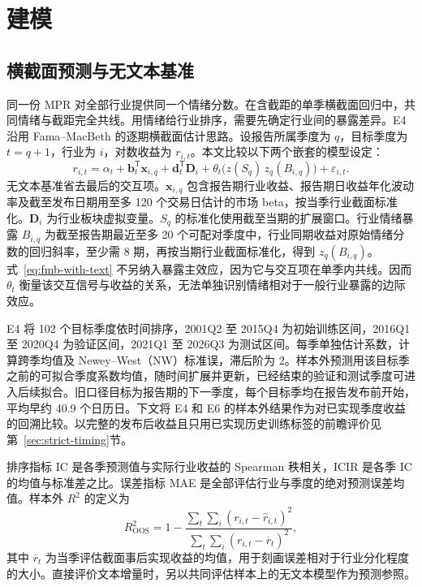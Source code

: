 \section{建模}\label{sec:models}

\subsection{横截面预测与无文本基准}

同一份 MPR 对全部行业提供同一个情绪分数。在含截距的单季横截面回归中，共同情绪与截距完全共线。用情绪给行业排序，需要先确定行业间的暴露差异。E4 沿用 Fama--MacBeth 的逐期横截面估计思路\cite{famaMacBeth1973}。设报告所属季度为 $q$，目标季度为 $t=q+1$，行业为 $i$，对数收益为 $r_{i,t}$。本文比较以下两个嵌套的模型设定：
\begin{equation}
  r_{i,t}=\alpha_t+\boldsymbol{b}_t^{\mathsf T}\boldsymbol{x}_{i,q}
     +\boldsymbol{d}_t^{\mathsf T}\boldsymbol{D}_i
     +\theta_t\bigl(z(S_q)\,z_q(B_{i,q})\bigr)+\varepsilon_{i,t}.
  \label{eq:fmb-with-text}
\end{equation}
无文本基准省去最后的交互项。$\boldsymbol{x}_{i,q}$ 包含报告期行业收益、报告期日收益年化波动率及截至发布日期用至多 120 个交易日估计的市场 beta，按当季行业截面标准化。$\boldsymbol{D}_i$ 为行业板块虚拟变量。$S_q$ 的标准化使用截至当期的扩展窗口。行业情绪暴露 $B_{i,q}$ 为截至报告期最近至多 20 个可配对季度中，行业同期收益对原始情绪分数的回归斜率，至少需 8 期，再按当期行业截面标准化，得到 $z_q(B_{i,q})$。式~\eqref{eq:fmb-with-text} 不另纳入暴露主效应，因为它与交互项在单季内共线。因而 $\theta_t$ 衡量该交互信号与收益的关系，无法单独识别情绪相对于一般行业暴露的边际效应。

E4 将 102 个目标季度依时间排序，2001Q2 至 2015Q4 为初始训练区间，2016Q1 至 2020Q4 为验证区间，2021Q1 至 2026Q3 为测试区间。每季单独估计系数，计算跨季均值及 Newey--West（NW）标准误，滞后阶为 2\cite{neweyWest1987}。样本外预测用该目标季之前的可拟合季度系数均值，随时间扩展并更新，已经结束的验证和测试季度可进入后续拟合。旧口径目标为报告期的下一季度，每个目标季均在报告发布前开始，平均早约 40.9 个日历日。下文将 E4 和 E6 的样本外结果作为对已实现季度收益的回溯比较。以完整的发布后收益且只用已实现历史训练标签的前瞻评价见第~\ref{sec:strict-timing}节。

排序指标 IC 是各季预测值与实际行业收益的 Spearman 秩相关，ICIR 是各季 IC 的均值与标准差之比。误差指标 MAE 是全部评估行业与季度的绝对预测误差均值。样本外 $R^2$ 的定义为
\begin{equation}
  R^2_{\mathrm{OOS}}=1-\frac{\sum_t\sum_i(r_{i,t}-\widehat r_{i,t})^2}
                {\sum_t\sum_i(r_{i,t}-\overline r_t)^2},
  \label{eq:oos-r2}
\end{equation}
其中 $\overline r_t$ 为当季评估截面事后实现收益的均值，用于刻画误差相对于行业分化程度的大小。直接评价文本增量时，另以共同评估样本上的无文本模型作为预测参照。

